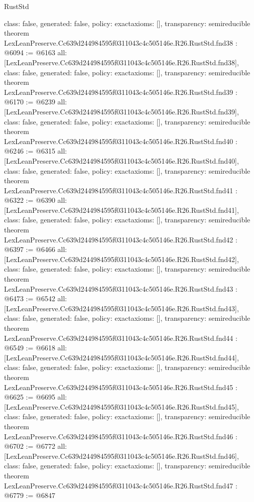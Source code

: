 \begin{lexlean}{RustStd}
\begin{coremodule}
{  class: false,
  generated: false,
  policy: exact{axioms: []},
  transparency: semireducible
}
theorem LexLeanPreserve.Cc639d244984595f0311043c4c505146e.R26.RustStd.fnd38 : @6094 := @6163 {
  all: [LexLeanPreserve.Cc639d244984595f0311043c4c505146e.R26.RustStd.fnd38],
  class: false,
  generated: false,
  policy: exact{axioms: []},
  transparency: semireducible
}
theorem LexLeanPreserve.Cc639d244984595f0311043c4c505146e.R26.RustStd.fnd39 : @6170 := @6239 {
  all: [LexLeanPreserve.Cc639d244984595f0311043c4c505146e.R26.RustStd.fnd39],
  class: false,
  generated: false,
  policy: exact{axioms: []},
  transparency: semireducible
}
theorem LexLeanPreserve.Cc639d244984595f0311043c4c505146e.R26.RustStd.fnd40 : @6246 := @6315 {
  all: [LexLeanPreserve.Cc639d244984595f0311043c4c505146e.R26.RustStd.fnd40],
  class: false,
  generated: false,
  policy: exact{axioms: []},
  transparency: semireducible
}
theorem LexLeanPreserve.Cc639d244984595f0311043c4c505146e.R26.RustStd.fnd41 : @6322 := @6390 {
  all: [LexLeanPreserve.Cc639d244984595f0311043c4c505146e.R26.RustStd.fnd41],
  class: false,
  generated: false,
  policy: exact{axioms: []},
  transparency: semireducible
}
theorem LexLeanPreserve.Cc639d244984595f0311043c4c505146e.R26.RustStd.fnd42 : @6397 := @6466 {
  all: [LexLeanPreserve.Cc639d244984595f0311043c4c505146e.R26.RustStd.fnd42],
  class: false,
  generated: false,
  policy: exact{axioms: []},
  transparency: semireducible
}
theorem LexLeanPreserve.Cc639d244984595f0311043c4c505146e.R26.RustStd.fnd43 : @6473 := @6542 {
  all: [LexLeanPreserve.Cc639d244984595f0311043c4c505146e.R26.RustStd.fnd43],
  class: false,
  generated: false,
  policy: exact{axioms: []},
  transparency: semireducible
}
theorem LexLeanPreserve.Cc639d244984595f0311043c4c505146e.R26.RustStd.fnd44 : @6549 := @6618 {
  all: [LexLeanPreserve.Cc639d244984595f0311043c4c505146e.R26.RustStd.fnd44],
  class: false,
  generated: false,
  policy: exact{axioms: []},
  transparency: semireducible
}
theorem LexLeanPreserve.Cc639d244984595f0311043c4c505146e.R26.RustStd.fnd45 : @6625 := @6695 {
  all: [LexLeanPreserve.Cc639d244984595f0311043c4c505146e.R26.RustStd.fnd45],
  class: false,
  generated: false,
  policy: exact{axioms: []},
  transparency: semireducible
}
theorem LexLeanPreserve.Cc639d244984595f0311043c4c505146e.R26.RustStd.fnd46 : @6702 := @6772 {
  all: [LexLeanPreserve.Cc639d244984595f0311043c4c505146e.R26.RustStd.fnd46],
  class: false,
  generated: false,
  policy: exact{axioms: []},
  transparency: semireducible
}
theorem LexLeanPreserve.Cc639d244984595f0311043c4c505146e.R26.RustStd.fnd47 : @6779 := @6847 {
}
\end{coremodule}
\end{lexlean}
